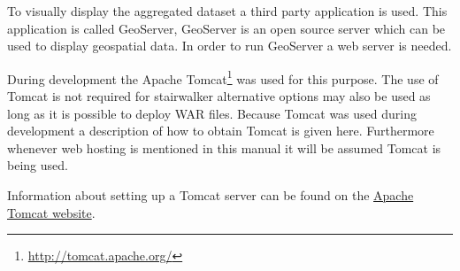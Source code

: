 To visually display the aggregated dataset a third party application is used. This application is called GeoServer, GeoServer is an open source server which can be used to display geospatial data. In order to run GeoServer a web server is needed. 

During development the Apache Tomcat\footnote{\url{http://tomcat.apache.org/}} was used for this purpose. The use of Tomcat is not required for stairwalker alternative options may also be used as long as it is possible to deploy WAR files. Because Tomcat was used during development a description of how to obtain Tomcat is given here. Furthermore whenever web hosting is mentioned in this manual it will be assumed Tomcat is being used.

Information about setting up a Tomcat server can be found on the \href{http://tomcat.apache.org/}{Apache Tomcat website}.